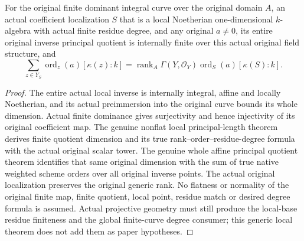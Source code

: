 \begin{theorem}
\label{thm:fc-local-finite-all-native-principal-orders}
\leanok
{}
For the original finite dominant integral curve over the original domain
$A$, an actual coefficient localization $S$ that is a local Noetherian
one-dimensional $k$-algebra with actual finite residue degree, and any
original $a\ne0$, its entire original inverse principal quotient is
internally finite over this actual original field structure, and
\[
 \sum_{z\in Y_S}\operatorname{ord}_z(a)[\kappa(z):k]
 =\operatorname{rank}_A\Gamma(Y,\mathcal O_Y)
   \operatorname{ord}_S(a)[\kappa(S):k].
\]
\end{theorem}
\begin{proof}
The entire actual local inverse is internally integral, affine and locally
Noetherian, and its actual preimmersion into the original curve bounds its
whole dimension.  Actual finite dominance gives surjectivity and hence
injectivity of its original coefficient map.  The genuine nonflat local
principal-length theorem derives finite quotient dimension and its true
rank--order--residue-degree formula with the actual original scalar tower.
The genuine whole affine principal quotient theorem identifies that same
original dimension with the sum of true native weighted scheme orders over
all original inverse points.  The actual original localization preserves
the original generic rank.  No flatness or normality of the original finite
map, finite quotient, local point, residue match or desired degree formula
is assumed.  Actual projective geometry must still produce the local-base
residue finiteness and the global finite-curve degree consumer; this generic
local theorem does not add them as paper hypotheses.
\end{proof}
